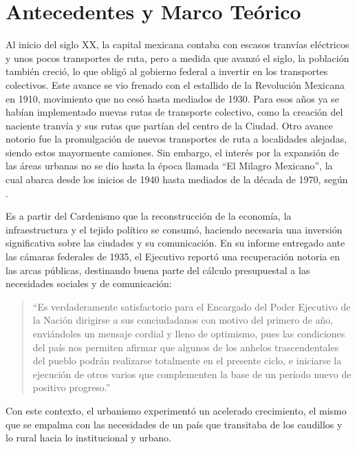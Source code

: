 
\chapter{Antecedentes y Marco Teórico}
\label{ch:marco-teorico}

Al inicio del siglo XX, la capital mexicana contaba con escasos tranvías
eléctricos
y unos pocos transportes de ruta, pero a medida que avanzó el siglo, la
población
también creció, lo que obligó al gobierno federal a invertir en los transportes
colectivos. Este avance se vio frenado con el estallido de la Revolución
Mexicana
en 1910, movimiento que no cesó hasta mediados de 1930. Para esos años ya se
habían implementado nuevas rutas de transporte colectivo, como la creación del
naciente tranvía y sus rutas que partían del centro de la Ciudad. Otro avance
notorio fue la promulgación de nuevos transportes de ruta a localidades
alejadas,
siendo estos mayormente camiones. Sin embargo, el interés por la expansión de
las
áreas urbanas no se dio hasta la época llamada ``El Milagro Mexicano'', la cual
abarca desde los inicios de 1940 hasta mediados de la década de 1970, según
\citet{molina2018}.

Es a partir del Cardenismo que la reconstrucción de la economía, la
infraestructura
y el tejido político se consumó, haciendo necesaria una inversión significativa
sobre
las ciudades y su comunicación. En su informe entregado ante las cámaras
federales
de 1935, el Ejecutivo reportó una recuperación notoria en las arcas públicas,
destinando buena parte del cálculo presupuestal a las necesidades sociales y de
comunicación:

\begin{quote}
``Es verdaderamente satisfactorio para el Encargado del Poder Ejecutivo de la
Nación dirigirse a sus conciudadanos con motivo del primero de año, enviándoles
un
mensaje cordial y lleno de optimismo, pues las condiciones del país nos permiten
afirmar que algunos de los anhelos trascendentales del pueblo podrán realizarse
totalmente en el presente ciclo, e iniciarse la ejecución de otros varios que
complementen la base de un período nuevo de positivo progreso.''
\citep[pp.~2--4]{biblioteca1935}
\end{quote}

Con este contexto, el urbanismo experimentó un acelerado crecimiento, el mismo
que se empalma con las necesidades de un país que transitaba de los caudillos y
lo
rural hacia lo institucional y urbano.


